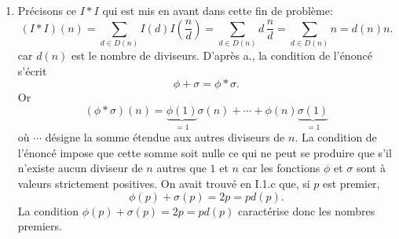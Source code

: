 \begin{enumerate}
\begin{enumerate}
 \item Précisons ce $I*I$ qui est mis en avant dans cette fin de problème:
\begin{displaymath}
 (I*I)(n) = \sum_{d\in D(n)}I(d)I(\frac{n}{d}) = \sum_{d\in D(n)}d\,\frac{n}{d}
= \sum_{d\in D(n)}n = d(n)n .
\end{displaymath}
car $d(n)$ est le nombre de diviseurs. D'après a., la condition de l'énoncé s'écrit
\begin{displaymath}
 \phi + \sigma = \phi * \sigma .
\end{displaymath}
Or
\begin{displaymath}
 (\phi * \sigma)(n) = \underset{=1}{\underbrace{\phi(1)}}\sigma(n) + \cdots +\phi(n)\underset{=1}{\underbrace{\sigma(1)}}
\end{displaymath}
où $\cdots$ désigne la somme étendue aux autres diviseurs de $n$. La condition de l'énoncé impose que cette somme soit nulle ce qui ne peut se produire que s'il n'existe aucun diviseur de $n$ autres que $1$ et $n$ car les fonctions $\phi$ et $\sigma$ sont à valeurs strictement positives.\newline
On avait trouvé en I.1.c que, si $p$ est premier,
\begin{displaymath}
 \phi(p) + \sigma(p) = 2p = pd(p) .
\end{displaymath}
La condition $\phi(p) + \sigma(p) = 2p = pd(p)$ caractérise donc les nombres premiers.
\end{enumerate}
\end{enumerate}
